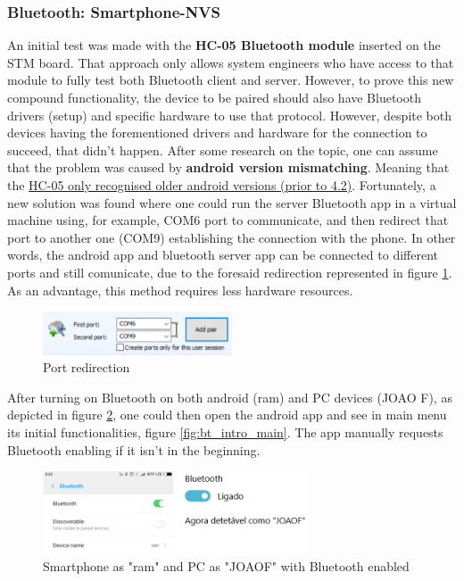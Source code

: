 \subsubsection{Bluetooth: Smartphone-NVS}%
\label{sec:bluetooth-phone-nvs}
%
An initial test was made with the \textbf{HC-05 Bluetooth module} inserted on the STM board. That approach only allows system engineers who have access to that module to fully test both Bluetooth client and server. 
%
However, to prove this new compound functionality, the device to be paired should also have Bluetooth drivers (setup) and specific hardware to use that protocol.
%
However, despite both devices having the forementioned drivers and hardware for the connection to succeed, that didn't happen. After some research on the topic, one can assume that the problem was caused by \textbf{android version mismatching}. Meaning that the \underline{HC-05 only recognised older android versions (prior to 4.2)}.
%
Fortunately, a new solution was found where one could run the server Bluetooth app in a virtual machine using, for example, COM6 port to communicate, and then redirect that port to another one (COM9) establishing the connection with the phone. In other words, the android app and bluetooth server app can be connected to different ports and still comunicate, due to the foresaid redirection represented in figure \ref{fig:port-red}. As an advantage, this method requires less hardware resources.
%
\begin{figure}[!ht]
\centering
\includegraphics[width=0.5\textwidth]{img/port-red.png}
\caption{\label{fig:port-red}Port redirection}
\end{figure}
%
After turning on Bluetooth on both android (ram) and PC devices (JOAO F), as depicted in figure \ref{fig:bt_app_pc}, one could then open the android app and see in main menu its initial functionalities, figure \ref{fig:bt_intro_main}. The app manually requests Bluetooth enabling if it isn't in the beginning.
%
\begin{figure}[!ht]
\centering
\includegraphics[width=0.7\textwidth]{img/bt_app_pc.png}
\caption{\label{fig:bt_app_pc}Smartphone as "ram" and PC as "JOAOF" with Bluetooth enabled}
\end{figure}
